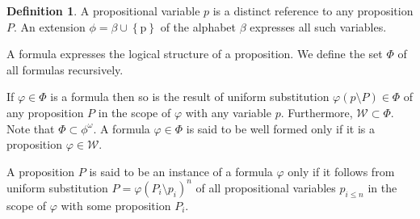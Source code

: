 \documentclass{amsbook}
\newcommand{\setsm}[1]{\left\{#1\right\}}
\newcommand{\wffs}{\mathcal W}
\theoremstyle{definition}
\newtheorem{dfn}{Definition}[section]
\begin{document}
\begin{dfn}
    A propositional variable $p$ is a distinct reference to any proposition $P$. An extension $\phi = \beta \cup \setsm{\mathrm p}$ of the alphabet $\beta$ expresses all such variables.

    A formula expresses the logical structure of a proposition. We define the set $\Phi$ of all formulas recursively.

    If $\varphi \in \Phi$ is a formula then so is the result of uniform substitution $\varphi(p \setminus P) \in \Phi$ of any proposition $P$ in the scope of $\varphi$ with any variable $p$. Furthermore, $\wffs \subset \Phi$. Note that $\Phi \subset \phi^\omega$. A formula $\varphi \in \Phi$ is said to be well formed only if it is a proposition $\varphi \in \wffs$.

    A proposition $P$ is said to be an instance of a formula $\varphi$ only if it follows from uniform substitution $P = \varphi(P_i \setminus p_i)^n$ of all propositional variables $p_{i \leq n}$ in the scope of $\varphi$ with some proposition $P_i$.
\end{dfn}
\end{document}
